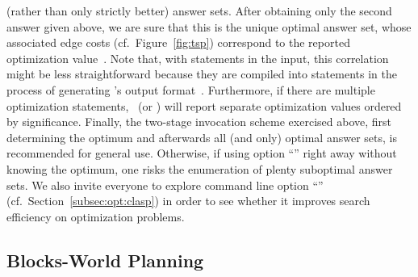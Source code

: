(rather than only strictly better) answer sets.%
%
After obtaining only the second answer given above,
we are sure that this is the unique optimal answer set,
whose associated edge costs (cf.\ Figure~\ref{fig:tsp}) correspond to
the reported optimization value~.
Note that, with  statements in the input, this correlation
might be less straightforward because they are compiled into 
statements in the process of generating \lparse's output format~\cite{lparseManual}.
Furthermore, if there are multiple optimization statements,
\clasp\ (or \clingo) will report separate optimization values ordered by significance.
Finally, the two-stage invocation scheme exercised above,
first determining the optimum and afterwards all (and only) optimal answer sets,
is recommended for general use.
Otherwise,
if using option ``'' right away without knowing the optimum,
one risks the enumeration of plenty suboptimal answer sets.
We also invite everyone to explore command line option ``''
(cf.\ Section~\ref{subsec:opt:clasp})
in order to see whether it improves search efficiency on optimization problems.


\subsection{Blocks-World Planning}\label{subsec:ex:block}

